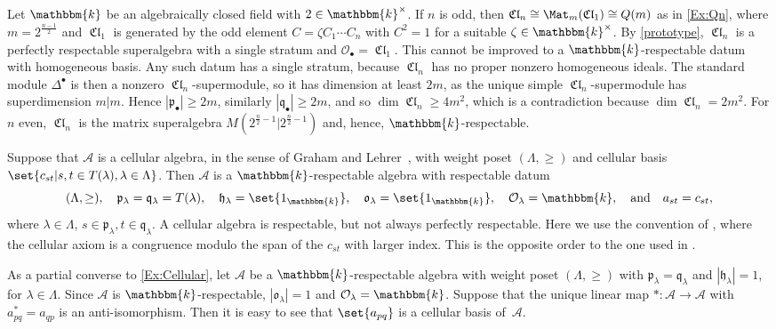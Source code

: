\documentclass[a4paper,11pt]{amsart}
\numberwithin{equation}{subsection}
\theoremstyle{definition}
\theoremstyle{theorem}
\theoremstyle{remark}
\DeclareMathOperator\Cl{\mathfrak{Cl}}
\newcommand\CA{\mathcal{A}}
\newcommand\CO{\mathcal{O}}
\newcommand\plam[1][\lambda]{\mathfrak{p}_{#1}}
\newcommand\hlam[1][\lambda]{\mathfrak{h}_{#1}}
\newcommand\qlam[1][\lambda]{\mathfrak{q}_{#1}}
\newcommand\Olam[1][\lambda]{\CO_{#1}}
\newcommand\olam[1][\lambda]{\mathfrak{o}_{#1}}
\newcommand\kk{\mathbbm{k}}
\begin{document}
\begin{Example}\label{Ex:CliffordRespectable}
  Let $\kk$ be an algebraically closed field with $2\in\kk^{\times}$. If $n$ is odd, then $\Cl_n\cong\Mat_m(\Cl_1)\cong Q(m)$ as in \autoref{Ex:Qn}, where $m=2^{\frac{n-1}{2}}$ and
  $\Cl_1$ is generated by the odd element $C=\zeta C_1\cdots C_n$ with $C^2=1$
  for a suitable $\zeta\in\kk^\times$. By \autoref{prototype}, $\Cl_n$ is a perfectly
  respectable superalgebra with a single stratum and $\Olam[\bullet]=\Cl_1$.
  This cannot be improved to a $\kk$-respectable datum with homogeneous basis.
  Any such datum has a single stratum, because $\Cl_n$ has no
  proper nonzero homogeneous ideals. The standard module $\Delta^\bullet$ is then a nonzero $\Cl_n$-supermodule, so it has dimension at least $2m$, as the unique simple $\Cl_n$-supermodule has superdimension $m|m$. Hence $|\plam[\bullet]|\ge2m$, similarly $|\qlam[\bullet]|\ge2m$, and so
  $\dim\Cl_n\ge4m^2$, which is a contradiction because $\dim\Cl_n=2m^2$. For $n$ even,
  $\Cl_n$ is the matrix superalgebra $M(2^{\frac n2-1}|2^{\frac
  n2-1})$ and, hence, $\kk$-respectable.
\end{Example}



  \begin{Example}\label{Ex:Cellular}
    Suppose that $\CA$ is a cellular algebra, in the sense of Graham and
    Lehrer~\cite{GrahamLehrer:Cellular}, with weight poset
    $(\Lambda,\ge)$ and cellular basis $\set{c_{st}|s,t\in T(\lambda),
    \lambda\in\Lambda}$. Then $\CA$ is a $\kk$-respectable algebra with respectable datum
    \[(\Lambda,\ge),\quad \plam=\qlam=T(\lambda), \quad \hlam=\set{1_\kk},\quad \olam=\set{1_\kk}, \quad \Olam=\kk, \quad\text{and} \quad a_{st}=c_{st},  \]
   where  $\lambda\in\Lambda$,  $s\in \plam, t\in \qlam$.  A cellular algebra is respectable, but not always perfectly respectable.
   Here we use the convention of \cite{Mathas:ULect}, where the cellular axiom is a congruence modulo the span of the $c_{st}$ with larger index. This is the opposite order to the one used in  \cite{GrahamLehrer:Cellular}.
     \end{Example}

  \begin{Example}
    As a partial converse to \autoref{Ex:Cellular}, let $\CA$ be a
    $\kk$-respectable algebra with weight poset $(\Lambda,\ge)$ with
    $\plam=\qlam$ and $|\hlam|=1$, for $\lambda\in\Lambda$. Since $\CA$ is
    $\kk$-respectable, $|\olam|=1$ and $\Olam=\kk$. Suppose that the
    unique linear map $*\colon \CA\to \CA$ with $a_{pq}^*=a_{qp}$ is
    an anti-isomorphism. Then it is easy to see that $\set{a_{pq}}$ is
    a cellular basis of~$\CA$.
     \end{Example}
\end{document}
